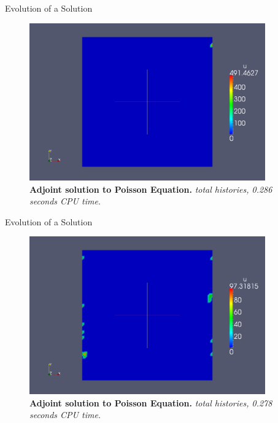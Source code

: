 \documentclass{beamer}
\begin{document}
\begin{frame}{Evolution of a Solution}

  \begin{figure}[h!]
    \begin{center}
      \includegraphics[width=4in]{adjoint_1.png}
    \end{center}
    \caption{\textbf{Adjoint solution to Poisson Equation.}
      \textit{ total histories, 0.286 seconds CPU time.} }
  \end{figure}

\end{frame}

\begin{frame}{Evolution of a Solution}

  \begin{figure}[h!]
    \begin{center}
      \includegraphics[width=4in]{adjoint_10.png}
    \end{center}
    \caption{\textbf{Adjoint solution to Poisson Equation.}
      \textit{ total histories, 0.278 seconds CPU time.} }
  \end{figure}

\end{frame}
\end{document}
